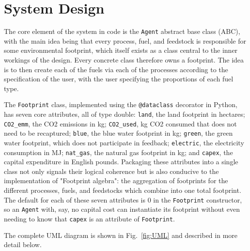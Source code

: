 \documentclass{article}
\begin{document}
\section*{System Design}
The core element of the system in code is the \texttt{Agent} abstract base class (ABC), with the main idea being that every process, fuel, and feedstock is responsible for some environmental footprint, which itself exists as a class central to the inner workings of the design. Every concrete class therefore owns a footprint. The idea is to then create each of the fuels via each of the processes according to the specification of the user, with the user specifying the proportions of each fuel type. 

The \texttt{Footprint} class, implemented using the \texttt{@dataclass} decorator in Python, has seven core attributes, all of type double: \texttt{land}, the land footprint in hectares; \texttt{CO2\_emm}, the CO2 emissions in kg; \texttt{CO2\_used}, kg CO2 consumed that does not need to be recaptured; \texttt{blue}, the blue water footprint in kg; \texttt{green}, the green water footprint, which does not participate in feedback; \texttt{electric}, the electricity consumption in MJ; \texttt{nat\_gas}, the natural gas footprint in kg; and \texttt{capex}, the capital expenditure in English pounds. Packaging these attributes into a single class not only signals their logical coherence but is also conducive to the implementation of "Footprint algebra": the aggregation of footprints for the different processes, fuels, and feedstocks which combine into one total footprint. The default for each of these seven attributes is 0 in the \texttt{Footprint} constructor, so an \texttt{Agent} with, say, no capital cost can instantiate its footprint without even needing to know that \texttt{capex} is an attribute of \texttt{Footprint}.

The complete UML diagram is shown in Fig.~\ref{fig:UML} and described in more detail below.
\end{document}
